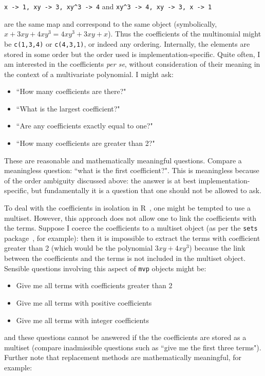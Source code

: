 \documentclass{article}
\begin{document}
\verb|x -> 1, xy -> 3, xy^3 -> 4| \hfill and\hfill
\verb|xy^3 -> 4, xy -> 3, x -> 1|

are the same map and correspond to the same object (symbolically,
$x+3xy+4xy^3=4xy^3+3xy+x$).  Thus the coefficients of the multinomial
might be \verb+c(1,3,4)+ or \verb+c(4,3,1)+, or indeed any ordering.
Internally, the elements are stored in some order but the order used
is implementation-specific.  Quite often, I am interested in the
coefficients {\em per se}, without consideration of their meaning in
the context of a multivariate polynomial.  I might ask:

\begin{itemize}
\item  ``How many coefficients are there?"
\item  ``What is the largest coefficient?"
\item  ``Are any coefficients exactly equal to one?"
\item  ``How many coefficients are greater than 2?"
\end{itemize}

These are reasonable and mathematically meaningful questions.  Compare
a meaningless question: ``what is the first coefficient?".  This is
meaningless because of the order ambiguity discussed above: the answer
is at best implementation-specific, but fundamentally it is a question
that one should not be allowed to ask.

To deal with the coefficients in isolation in R~\cite{rcore2022}, one
might be tempted to use a multiset.  However, this approach does not
allow one to link the coefficients with the terms.  Suppose I coerce
the coefficients to a multiset object (as per the {\tt sets}
package~\cite{meyer2009,meyer2022}, for example): then it is
impossible to extract the terms with coefficient greater than 2 (which
would be the polynomial $3xy+4xy^3$) because the link between the
coefficients and the terms is not included in the multiset object.
Sensible questions involving this aspect of {\tt mvp} objects might
be:


\begin{itemize}
\item Give me all terms with coefficients greater than 2
\item Give me all terms with positive coefficients
\item Give me all terms with integer coefficients
\end{itemize}

and these questions cannot be answered if the the coefficients are
stored as a multiset (compare inadmissible questions such as ``give me
the first three terms").  Further note that replacement methods are
mathematically meaningful, for example:
\end{document}
